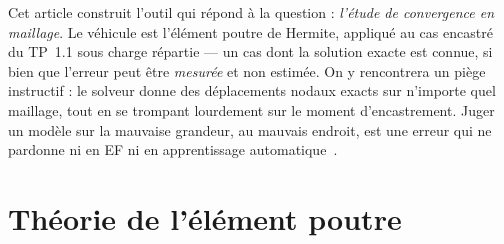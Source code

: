 \documentclass[10pt,journal]{IEEEtran}
\begin{document}
Cet article construit l'outil qui répond à la question : \emph{l'étude de convergence en maillage}. Le véhicule est l'élément poutre de Hermite, appliqué au cas encastré du TP~1.1 sous charge répartie --- un cas dont la solution exacte est connue, si bien que l'erreur peut être \emph{mesurée} et non estimée. On y rencontrera un piège instructif : le solveur donne des déplacements nodaux exacts sur n'importe quel maillage, tout en se trompant lourdement sur le moment d'encastrement. Juger un modèle sur la mauvaise grandeur, au mauvais endroit, est une erreur qui ne pardonne ni en EF ni en apprentissage automatique~\cite{oberkampf,forrester}.

\section{Théorie de l'élément poutre}
\end{document}
